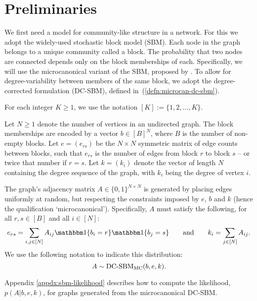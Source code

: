 \section{Preliminaries}

We first need a model for community-like structure in a network. For this we adopt the widely-used stochastic block model (SBM).
Each node in the graph belongs to a unique community called a block. The probability that two nodes are connected depends only on the block memberships of each. Specifically, we will use the microcanonical variant of the SBM, proposed by \citet{Peixoto-Bayesian-Microcanonical}. To allow for degree-variability between members of the same block, we adopt the degree-corrected formulation (DC-SBM), defined in~(\ref{defn:microcan-dc-sbm}).

For each integer $K\geq 1$, we use the notation $[K]:=\{1,2,\ldots,K\}$.

\begin{definition}
	\label{defn:microcan-dc-sbm}
	Let $N \geq 1$ denote the number of vertices in an undirected graph. The block memberships are encoded by a vector $b \in [B]^N$,
where $B$ is the number of non-empty blocks.
	Let $e=(e_{rs})$ be the $N\times N$ symmetric matrix of edge counts 
between blocks, such that $e_{rs}$ is the number of edges from block $r$ to 
block $s$ -- or twice that number if $r=s$. 
	Let $k =(k_i)$ denote the vector of length $N$ containing the degree
sequence of the graph, with $k_i$ being the degree of vertex $i$.

The graph's adjacency matrix $A \in \{0,1\}^{N \times N}$ is generated 
by placing edges uniformly at random, but respecting the constraints 
imposed by $e$, $b$ and $k$ (hence the qualification `microcanonical').
Specifically, $A$ must satisfy the following, for all $r,s\in[B]$
and all $i\in[N]$:
	\begin{equation}
		e_{rs} = \sum_{i, j \in [N]} A_{ij} 
	\one \{b_i = r\} \one \{b_j = s\} 
		\qquad 
		\textrm{and} \qquad
		k_i = \sum_{j \in [N]} A_{ij}.
		\label{eqn:sbm-constraints}
	\end{equation}
We use the following notation to indicate this distribution:
\begin{equation}
		A \sim \mbox{\rm DC-SBM}_{\rm MC} (b, e, k).
	\end{equation}
\end{definition}

Appendix \ref{appdx:sbm-likelihood} describes how to compute the likelihood, $p(A|b,e,k)$, for graphs generated from the microcanonical DC-SBM.
